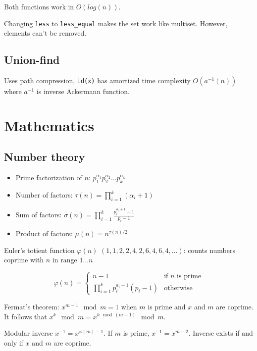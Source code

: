 \documentclass{article}
\begin{document}
Both functions work in $O(log(n))$.

Changing \texttt{less} to \verb|less_equal| makes the set work like multiset. However, elements can't be removed.



\subsection{Union-find}

Uses path compression, \texttt{id(x)} has amortized time complexity $O(a^{-1}(n))$ where $a^{-1}$ is inverse Ackermann function.



\section {Mathematics}

\subsection {Number theory}

\begin{itemize}
	\item Prime factorization of $n$: $p_1^{\alpha_1}p_2^{\alpha_2} \dots p_k^{\alpha_k}$
	\item Number of factors: $\tau(n) = \prod_{i=1}^{k} (\alpha_i+1)$
	\item Sum of factors: $\sigma(n) = \prod_{i=1}^{k} \frac{p_i^{\alpha_i+1}-1}{p_i-1}$
	\item Product of factors: $\mu(n) = n^{\tau(n)/2}$
\end{itemize}

Euler's totient function $\varphi(n)$ $(1, 1, 2, 2, 4, 2, 6, 4, 6, 4, \dots)$: counts numbers coprime with $n$ in range $1 \dots n$

\[
	\varphi(n) =
	\begin{cases}
		n-1 &\text{if $n$ is prime} \\
		\prod_{i=1}^{k} p_i^{a_i-1}(p_i-1) &\text{otherwise}
	\end{cases}
\]

Fermat's theorem: $x^{m-1} \mod m = 1$ when $m$ is prime and $x$ and $m$ are coprime. It follows that $x^k \mod m = x^{k \mod (m-1)} \mod m$.

Modular inverse $x^{-1} = x^{\varphi(m)-1}$. If $m$ is prime, $x^{-1} = x^{m-2}$. Inverse exists if and only if $x$ and $m$ are coprime.
\end{document}
